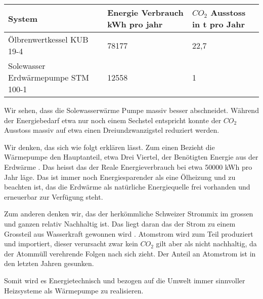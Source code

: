 \begin{tabular}{|l|l|l|}

\hline
  System   & Energie Verbrauch kWh pro jahr & $CO_2$ Ausstoss in t pro Jahr\\
\hline
 Ölbrenwertkessel KUB 19-4           & 78177 & 22,7 \\
\hline
 Solewasser Erdwärmepumpe STM 100-1  & 12558 & 1     \\
\hline
\end{tabular}

Wir sehen, dass die Solewasserwärme Pumpe massiv besser abschneidet.
Während der Energiebedarf etwa nur noch einem Sechstel entspricht konnte
der $CO_2$ Ausstoss massiv auf etwa einen Dreiundzwanzigstel reduziert werden.

Wir denken, das sich wie folgt erklären lässt.
Zum einen Bezieht die Wärmepumpe den Hauptanteil, etwa Drei Viertel, der Benötigten Energie
aus der Erdwärme \cite{junkers:funktionwarmepumpe}.
Das heisst das der Reale Energieverbrauch bei etwa 50000 kWh
pro Jahr läge. Das ist immer noch Energiesparender als eine Ölheizung und
zu beachten ist, das die Erdwärme als natürliche Energiequelle frei vorhanden
und erneuerbar zur Verfügung steht.

Zum anderen denken wir, das der herkömmliche Schweizer Strommix im grossen und
ganzen relativ Nachhaltig ist. Das liegt daran das der Strom zu einem Grossteil
aus Wasserkraft gewonnen wird \cite{bafu:strommix}.
Atomstrom wird zum Teil produziert und importiert, dieser verursacht zwar kein
$CO_2$ gilt aber als nicht nachhaltig, da der Atommüll verehrende Folgen
nach sich zieht.
Der Anteil an Atomstrom ist in den letzten Jahren gesunken.

Somit wird es Energietechnisch und bezogen auf die Umwelt immer sinnvoller
Heizsysteme als Wärmepumpe zu realisieren.
